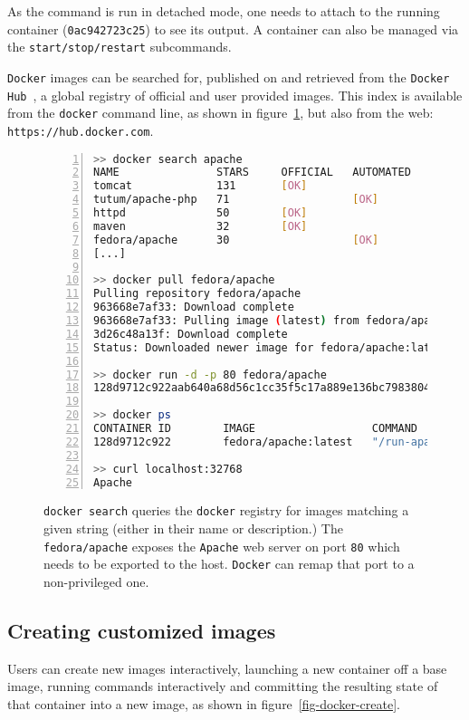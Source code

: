\documentclass[a4paper]{jpconf}
\begin{document}
As the command is run in detached mode, one needs to attach to the running
container (\texttt{0ac942723c25}) to see its output.
A container can also be managed via the \texttt{start/stop/restart} subcommands.

\texttt{Docker} images can be searched for, published on and retrieved from the
\texttt{Docker Hub}~\cite{ref-docker-hub}, a global registry of official and
user provided images.
This index is available from the \texttt{docker} command line, as shown in
figure~\ref{fig-docker-search}, but also from the
web: \texttt{https://hub.docker.com}.

\begin{figure}[h]
	\begin{lstlisting}[language=sh,
		basicstyle=\tiny,
		frame=trbl,
		numbers=left,
		showstringspaces=false,
	stringstyle=\ttfamily]
>> docker search apache
NAME               STARS     OFFICIAL   AUTOMATED
tomcat             131       [OK]       
tutum/apache-php   71                   [OK]
httpd              50        [OK]       
maven              32        [OK]       
fedora/apache      30                   [OK]
[...]

>> docker pull fedora/apache
Pulling repository fedora/apache
963668e7af33: Download complete 
963668e7af33: Pulling image (latest) from fedora/apache 
3d26c48a13f: Download complete 
Status: Downloaded newer image for fedora/apache:latest

>> docker run -d -p 80 fedora/apache
128d9712c922aab640a68d56c1cc35f5c17a889e136bc7983804035333264d92

>> docker ps
CONTAINER ID        IMAGE                  COMMAND             PORTS
128d9712c922        fedora/apache:latest   "/run-apache.sh"    0.0.0.0:32768->80/tcp

>> curl localhost:32768
Apache

\end{lstlisting}
\caption{\label{fig-docker-search}\texttt{docker search} queries the
	\texttt{docker} registry for images matching a given string (either in their
	name or description.)
	The \texttt{fedora/apache} exposes the \texttt{Apache} web server on port
	\texttt{80} which needs to be exported to the host.
	\texttt{Docker} can remap that port to a non-privileged one.
}
\end{figure}

\subsection{Creating customized images}
Users can create new images interactively, launching a new container off a base
image, running commands interactively and committing the resulting state of that
container into a new image, as shown in figure~\ref{fig-docker-create}.
\end{document}
